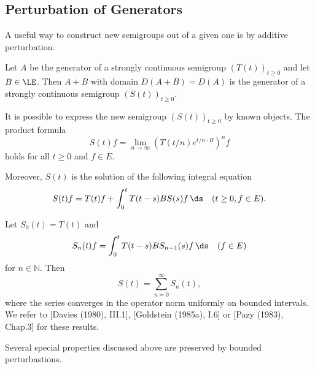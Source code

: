 \subsection{Perturbation of Generators} \label{subsec:a2-1.se8}
A useful way to construct new semigroups out of a given one is by additive perturbation.

\begin{theorem}\label{thm:a2-1.29}
Let $A$ be the generator of a strongly continuous semigroup $(T(t))_{t \geq 0}$ and let $B \in \LE$.
Then $A + B$ with domain $D(A+B) = D(A)$ is the generator of a strongly continuous semigroup $(S(t))_{t \geq 0}$.
\end{theorem}

It is possible to express the new semigroup $(S(t))_{t \geq 0}$ by known objects.
The product formula
\begin{equation}\label{eq:a2-1.8}
    S(t)f = \lim_{n \to \infty} (T(t/n)e^{t/n \cdot B})^{n}f
\end{equation}
holds for all $t \geq 0$ and $f \in E$.

Moreover, $S(t)$ is the solution of the following integral equation
\begin{equation}\label{eq:a2-1.9}
    S(t)f = T(t)f + \int_{0}^{t} T(t-s)BS(s)f\, \ds \quad (t \geq 0, f \in E).
\end{equation}

Let $S_{0}(t) = T(t)$ and
\begin{equation}\label{eq:a2-1.10}
    S_{n}(t)f = \int_{0}^{t} T(t-s)BS_{n-1}(s)f\, \ds \quad (f \in E)
\end{equation}
for $n \in \mathbb{N}$. Then
\begin{equation}\label{eq:a2-1.11}
    S(t) = \sum_{n=0}^{\infty} S_{n}(t),
\end{equation}
where the series converges in the operator norm uniformly on bounded intervals.
We refer to [Davies (1980), III.1], [Goldstein (1985a), I.6] or [Pazy (1983), Chap.3] for these results.

Several special properties discussed above are preserved by bounded perturbastions.

